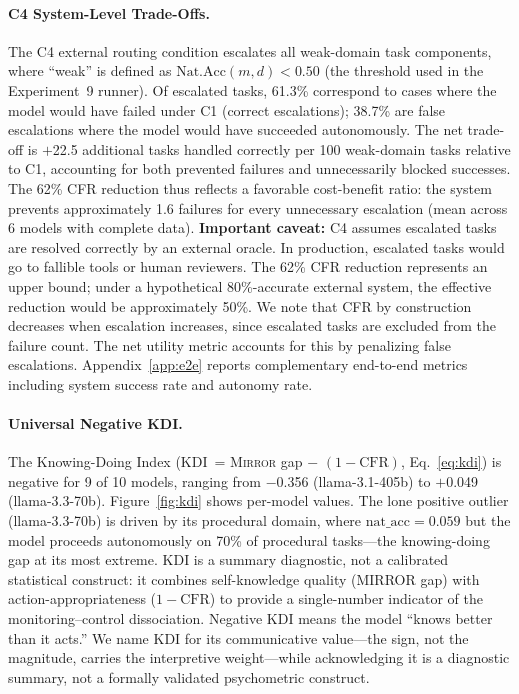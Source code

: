\documentclass[10pt]{article}
\newcommand{\mirror}{\textsc{Mirror}}
\newcommand{\KDI}{KDI}
\begin{document}
\paragraph{C4 System-Level Trade-Offs.}
The C4 external routing condition escalates all weak-domain task components,
where ``weak'' is defined as $\text{Nat.Acc}(m,d) < 0.50$ (the threshold used in
the Experiment~9 runner). Of escalated tasks,
61.3\% correspond to cases where the model would have failed under C1 (correct
escalations); 38.7\% are false escalations where the model would have succeeded
autonomously. The net trade-off is $+$22.5 additional tasks handled correctly per
100 weak-domain tasks relative to C1, accounting for both prevented failures and
unnecessarily blocked successes. The 62\% CFR reduction thus reflects a favorable
cost-benefit ratio: the system prevents approximately 1.6 failures for every
unnecessary escalation (mean across 6 models with complete data).
\textbf{Important caveat:} C4 assumes escalated tasks are resolved correctly by an
external oracle. In production, escalated tasks would go to fallible tools or
human reviewers. The 62\% CFR reduction represents an upper bound; under a
hypothetical 80\%-accurate external system, the effective reduction would be
approximately 50\%.
We note that CFR by construction decreases when escalation increases, since
escalated tasks are excluded from the failure count. The net utility metric
accounts for this by penalizing false escalations. Appendix~\ref{app:e2e}
reports complementary end-to-end metrics including system success rate and
autonomy rate.

\paragraph{Universal Negative \KDI{}.}
The Knowing-Doing Index (\KDI{}~= \mirror{} gap $-$ $(1 - \text{CFR})$,
Eq.~\ref{eq:kdi}) is negative for 9 of 10 models, ranging from $-$0.356 (llama-3.1-405b) to
$+$0.049 (llama-3.3-70b). Figure~\ref{fig:kdi} shows per-model values. The lone
positive outlier (llama-3.3-70b) is driven by its procedural domain, where
$\text{nat\_acc} = 0.059$ but the model proceeds autonomously on 70\% of
procedural tasks---the knowing-doing gap at its most extreme.
KDI is a summary diagnostic, not a calibrated statistical construct: it combines
self-knowledge quality (MIRROR gap) with action-appropriateness ($1 - \text{CFR}$)
to provide a single-number indicator of the monitoring--control dissociation.
Negative KDI means the model ``knows better than it acts.'' We name KDI for its
communicative value---the sign, not the magnitude, carries the interpretive
weight---while acknowledging it is a diagnostic summary, not a formally validated
psychometric construct.
\end{document}
